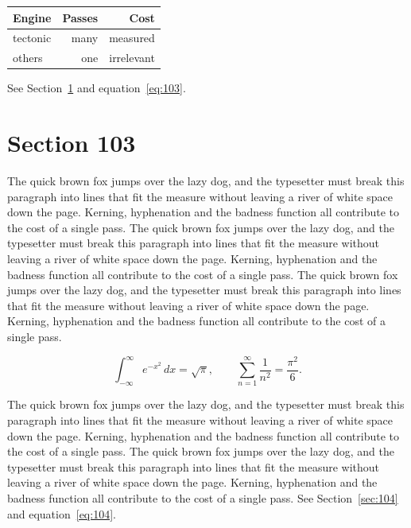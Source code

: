 \documentclass{article}
\begin{document}
\begin{center}
\begin{tabular}{lrr}
\toprule
Engine & Passes & Cost \\
\midrule
tectonic & many & measured \\
others & one & irrelevant \\
\bottomrule
\end{tabular}
\end{center}

See Section~\ref{sec:103} and equation~\eqref{eq:103}.
\section{Section 103}
\label{sec:103}
The quick brown fox jumps over the lazy dog, and the typesetter must break this paragraph into lines that fit the measure without leaving a river of white space down the page. Kerning, hyphenation and the badness function all contribute to the cost of a single pass. The quick brown fox jumps over the lazy dog, and the typesetter must break this paragraph into lines that fit the measure without leaving a river of white space down the page. Kerning, hyphenation and the badness function all contribute to the cost of a single pass. The quick brown fox jumps over the lazy dog, and the typesetter must break this paragraph into lines that fit the measure without leaving a river of white space down the page. Kerning, hyphenation and the badness function all contribute to the cost of a single pass. 

\begin{equation}\label{eq:103}
\int_{-\infty}^{\infty} e^{-x^{2}}\,dx = \sqrt{\pi}, \qquad
\sum_{n=1}^{\infty} \frac{1}{n^{2}} = \frac{\pi^{2}}{6}.
\end{equation}

The quick brown fox jumps over the lazy dog, and the typesetter must break this paragraph into lines that fit the measure without leaving a river of white space down the page. Kerning, hyphenation and the badness function all contribute to the cost of a single pass. The quick brown fox jumps over the lazy dog, and the typesetter must break this paragraph into lines that fit the measure without leaving a river of white space down the page. Kerning, hyphenation and the badness function all contribute to the cost of a single pass. 
See Section~\ref{sec:104} and equation~\eqref{eq:104}.
\end{document}

